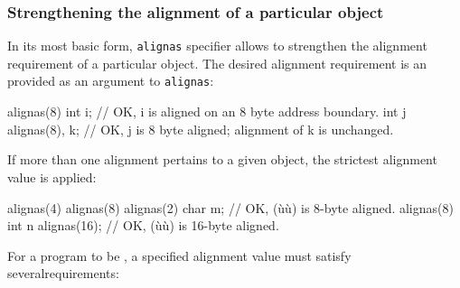 \subsubsection[Strengthening the alignment of a particular object]{Strengthening the alignment of a particular object}\label{restricting-the-alignment-of-a-particular-object}\label{strengthening-the-alignment-of-a-particular-object}

In its most basic form, \lstinline!alignas! specifier allows to strengthen the alignment requirement of a particular object. The desired alignment requirement is an  provided as an argument to \lstinline!alignas!:

\begin{emcppslisting}
alignas(8) int i;   // OK, i is aligned on an 8 byte address boundary. 
int j alignas(8), k; // OK, j is 8 byte aligned; alignment of k is unchanged.
\end{emcppslisting}
    
\noindent If more than one alignment pertains to a given object, the strictest alignment value is applied:

\begin{emcppslisting}
alignas(4) alignas(8) alignas(2) char m;  // OK, (ù{}ù) is 8-byte aligned.
alignas(8) int n alignas(16);             // OK, (ù{}ù) is 16-byte aligned.
\end{emcppslisting}
    
\noindent For a program to be , a specified alignment value
must satisfy several\linebreak[4] \mbox{requirements}:

